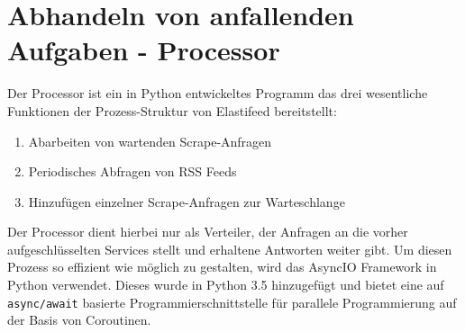 \section{Abhandeln von anfallenden Aufgaben - Processor}

Der Processor ist ein in Python entwickeltes Programm das drei wesentliche Funktionen der Prozess-Struktur von Elastifeed bereitstellt:
\begin{enumerate}
        \item Abarbeiten von wartenden Scrape-Anfragen
        \item Periodisches Abfragen von RSS Feeds
        \item Hinzufügen einzelner Scrape-Anfragen zur Warteschlange
\end{enumerate}
Der Processor dient hierbei nur als Verteiler, der Anfragen an die vorher aufgeschlüsselten Services stellt und erhaltene Antworten weiter gibt.
Um diesen Prozess so effizient wie möglich zu gestalten, wird das AsyncIO Framework in Python verwendet.
Dieses wurde in Python 3.5 hinzugefügt \cite{aiopy} und bietet eine auf \texttt{async/await} basierte Programmierschnittstelle für parallele Programmierung auf der Basis von Coroutinen.

